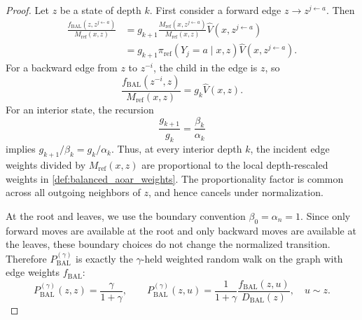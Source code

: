\documentclass{article}
\numberwithin{theorem}{section}
\numberwithin{proposition}{section}
\numberwithin{corollary}{section}
\numberwithin{lemma}{section}
\numberwithin{conjecture}{section}
\numberwithin{remark}{section}
\numberwithin{definition}{section}
\numberwithin{assumption}{section}
\numberwithin{example}{section}
\providecommand{\base}{\pi_{\mathrm{ref}}}
\begin{document}
\begin{proof}
Let $z$ be a state of depth $k$. First consider a forward edge $z\to z^{j\leftarrow a}$. Then
\begin{align*}
    \frac{f_{\mathrm{BAL}}(z,z^{j\leftarrow a})}{M_{\text{ref}}(x,z)}
    &=
    g_{k+1}
    \frac{M_{\text{ref}}(x,z^{j\leftarrow a})}{M_{\text{ref}}(x,z)}
    \widehat V(x,z^{j\leftarrow a}) \\
    &=
    g_{k+1}\base(Y_j=a\mid x,z)\widehat V(x,z^{j\leftarrow a}).
\end{align*}
For a backward edge from $z$ to $z^{-i}$, the child in the edge is $z$, so
\begin{equation*}
    \frac{f_{\mathrm{BAL}}(z^{-i},z)}{M_{\text{ref}}(x,z)}=g_k \widehat V(x,z).
\end{equation*}
For an interior state, the recursion
\begin{equation*}
    \frac{g_{k+1}}{g_k} = \frac{\beta_k}{\alpha_k}
\end{equation*}
implies $g_{k+1}/\beta_k=g_k/\alpha_k$. Thus, at every interior depth $k$, the incident edge weights divided by $M_{\text{ref}}(x,z)$ are proportional to the local depth-rescaled weights in \cref{def:balanced_aoar_weights}. The proportionality factor is common across all outgoing neighbors of $z$, and hence cancels under normalization.

At the root and leaves, we use the boundary convention $\beta_0=\alpha_n=1$. Since only forward moves are available at the root and only backward moves are available at the leaves, these boundary choices do not change the normalized transition. Therefore $P_{\mathrm{BAL}}^{(\gamma)}$ is exactly the $\gamma$-held weighted random walk on the graph with edge weights $f_{\mathrm{BAL}}$:
\begin{equation*}
    P_{\mathrm{BAL}}^{(\gamma)}(z,z)=\frac{\gamma}{1+\gamma}, \qquad
    P_{\mathrm{BAL}}^{(\gamma)}(z,u)=\frac{1}{1+\gamma}\frac{f_{\mathrm{BAL}}(z,u)}{D_{\mathrm{BAL}}(z)}, \quad u\sim z.
\end{equation*}


\end{proof}
\end{document}
